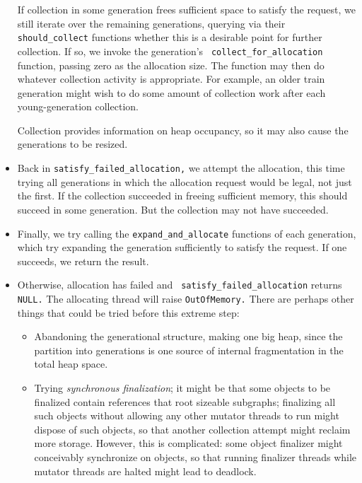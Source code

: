 \documentclass{article}
\begin{document}
\begin{itemize}
If collection in some generation frees sufficient space to satisfy the
request, we still iterate over the remaining generations, querying via
their {\tt should\_collect} functions whether this is a desirable point
for further collection.  If so, we invoke the generation's {\tt
collect\_for\_allocation} function, passing zero as the allocation
size.  The function may then do whatever collection activity is
appropriate.    For example, an older train generation might wish
to do some amount of collection work after each young-generation
collection.

Collection provides information on heap occupancy, so it may also
cause the generations to be resized.

\item Back in {\tt satisfy\_failed\_allocation,} we attempt the
allocation, this time trying all generations in which the allocation
request would be legal, not just the first.  If the collection
succeeded in freeing sufficient memory, this should succeed in some
generation.  But the collection may not have succeeded.

\item Finally, we try calling the {\tt expand\_and\_allocate} functions
of each generation, which try expanding the generation sufficiently to
satisfy the request.  If one succeeds, we return the result.

\item Otherwise, allocation has failed and {\tt
satisfy\_failed\_allocation} returns {\tt NULL.}  The allocating thread
will raise {\tt OutOfMemory.}  There are perhaps other things that
could be tried before this extreme step:
\begin{itemize}
\item Abandoning the generational structure, making one big heap,
since the partition into generations is one source of internal
fragmentation in the total heap space.

\item Trying {\em synchronous finalization}; it might be that some
objects to be finalized contain references that root sizeable
subgraphs; finalizing all such objects without allowing any other
mutator threads to run might dispose of such objects, so that another
collection attempt might reclaim more storage.  However, this is
complicated: some object finalizer might conceivably
synchronize on objects, so that running finalizer threads while
mutator threads are halted might lead to deadlock.
\end{itemize}
\end{itemize}
\end{document}
